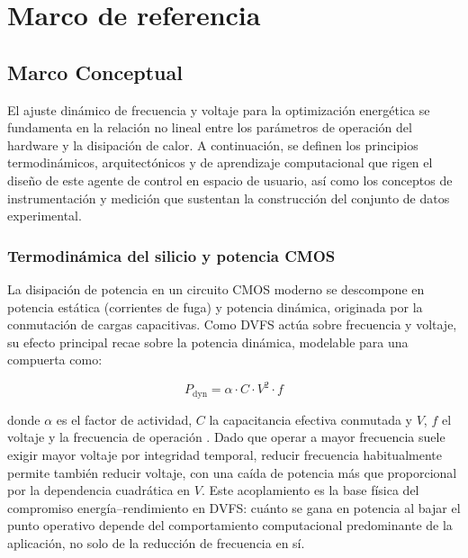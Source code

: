 \documentclass[12pt,oneside,spanish]{book}
\begin{document}

\chapter{Marco de referencia}

\section{Marco Conceptual}

El ajuste dinámico de frecuencia y voltaje para la optimización energética se fundamenta en la relación no lineal entre los parámetros de operación del hardware y la disipación de calor. A continuación, se definen los principios termodinámicos, arquitectónicos y de aprendizaje computacional que rigen el diseño de este agente de control en espacio de usuario, así como los conceptos de instrumentación y medición que sustentan la construcción del conjunto de datos experimental.

\subsection{Termodinámica del silicio y potencia CMOS}

La disipación de potencia en un circuito CMOS moderno se descompone en potencia estática (corrientes de fuga) y potencia dinámica, originada por la conmutación de cargas capacitivas. Como DVFS actúa sobre frecuencia y voltaje, su efecto principal recae sobre la potencia dinámica, modelable para una compuerta como:

\begin{equation}
P_{\text{dyn}} = \alpha \cdot C \cdot V^{2} \cdot f
\end{equation}

donde $\alpha$ es el factor de actividad, $C$ la capacitancia efectiva conmutada y $V$, $f$ el voltaje y la frecuencia de operación \cite{Gonzalez1997}. Dado que operar a mayor frecuencia suele exigir mayor voltaje por integridad temporal, reducir frecuencia habitualmente permite también reducir voltaje, con una caída de potencia más que proporcional por la dependencia cuadrática en $V$. Este acoplamiento es la base física del compromiso energía--rendimiento en DVFS: cuánto se gana en potencia al bajar el punto operativo depende del comportamiento computacional predominante de la aplicación, no solo de la reducción de frecuencia en sí.
\end{document}
